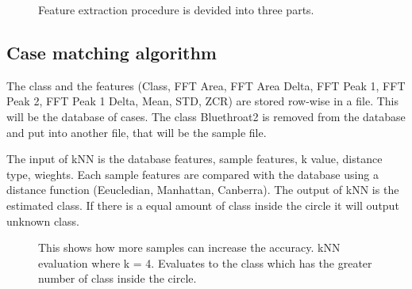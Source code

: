 \begin{figure}[htp]




    \caption{Feature extraction procedure is devided into three parts.}
    \label{fig:featureExtraction}
\end{figure}



\subsection{Case matching algorithm}
The class and the features
(Class, FFT Area, FFT Area Delta, FFT Peak 1, FFT Peak 2, FFT Peak 1 Delta, Mean, STD, ZCR)
are stored row-wise in a file. This will be the database of cases.
The class Bluethroat2 is removed from the database and put into another file, that will be the sample file.

The input of kNN is the database features, sample features, k value, distance type, wieghts.
Each sample features are compared with the database using a distance function (Eeucledian, Manhattan, Canberra).
The output of kNN is the estimated class.
If there is a equal amount of class inside the circle it will output unknown class.

\begin{figure}[htp]


    \caption{This shows how more samples can increase the accuracy. kNN evaluation where k = 4. Evaluates to the class which has the greater number of class inside the circle.}
    \label{fig:featureExtraction}
\end{figure}
